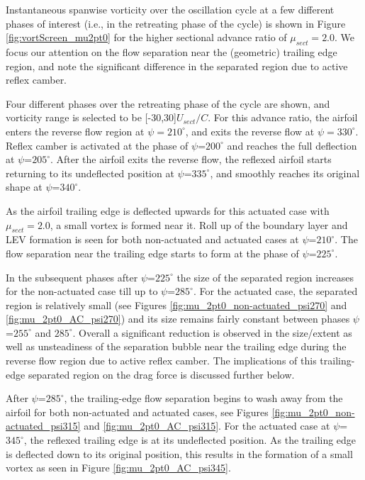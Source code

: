 Instantaneous spanwise vorticity over the oscillation cycle at a few different phases of interest (i.e., in the retreating phase of the cycle) is shown in Figure \ref{fig:vortScreen_mu2pt0} for the higher sectional advance ratio of $\mu_{sect}=2.0$.
We focus our attention on the flow separation near the (geometric) trailing edge region, and note the significant difference in the separated region due to active reflex camber.

Four different phases over the retreating phase of the cycle are shown, and vorticity range is selected to be [-30,30]$ U_{sect} /C$. For this advance ratio, the airfoil enters the reverse flow region at $\psi=210^\circ$, and exits the reverse flow at $\psi=330^\circ$.
Reflex camber is activated at the phase of $\psi$=$200^\circ$ and reaches the full deflection at $\psi$=$205^\circ$.
After the airfoil exits the reverse flow, the reflexed airfoil starts returning to its undeflected position at $\psi$=$335^\circ$, and smoothly reaches its original shape at $\psi$=$340^\circ$.

As the airfoil trailing edge is deflected upwards for this actuated case with $\mu_{sect}=2.0$, a small vortex is formed near it. Roll up of the boundary layer and LEV formation is seen for both non-actuated and actuated cases at $\psi$=$210^\circ$.
The flow separation near the trailing edge starts to form at the phase of $\psi$=$225^\circ$.

In the subsequent phases after $\psi$=$225^\circ$ the size of the separated region increases for the non-actuated case till up to $\psi$=$285^\circ$.
For the actuated case, the separated region is relatively small (see Figures \ref{fig:mu_2pt0_non-actuated_psi270} and \ref{fig:mu_2pt0_AC_psi270}) and its size remains fairly constant between phases $\psi$=$255^\circ$ and $285^\circ$.
Overall a significant reduction is observed in the size/extent as well as unsteadiness of the separation bubble near the trailing edge during the reverse flow region due to active reflex camber.
The implications of this trailing-edge separated region on the drag force is discussed further below.

After $\psi$=$285^\circ$, the trailing-edge flow separation begins to wash away from the airfoil for both non-actuated and actuated cases, see Figures \ref{fig:mu_2pt0_non-actuated_psi315} and \ref{fig:mu_2pt0_AC_psi315}. 
For the actuated case at $\psi$=$345^\circ$, the reflexed trailing edge is at its undeflected position.
As the trailing edge is deflected down to its original position, this results in the formation of a small vortex as seen in Figure \ref{fig:mu_2pt0_AC_psi345}.


